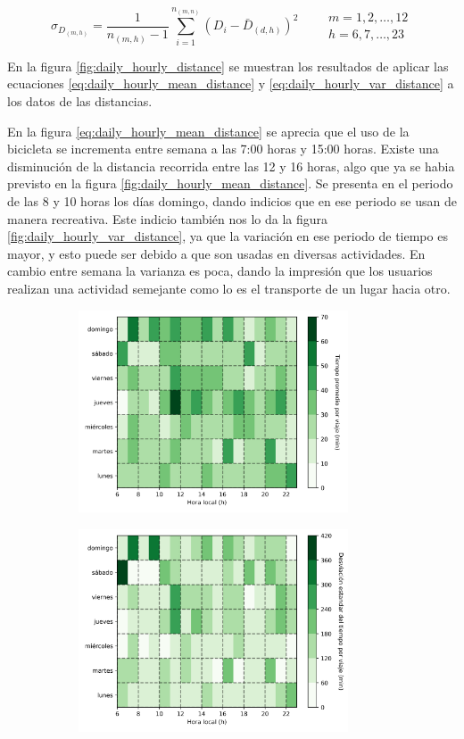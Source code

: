 \begin{equation}
    \sigma_{D_{(m,h)}} = \frac{1}{n_{(m,h)}-1} \sum_{i=1}^{n_{(m,n)}} (D_i-\bar{D}_{(d,h)})^2 \qquad \begin{matrix}
        m=1,2,\dots,12 \\ h=6,7,\dots,23
    \end{matrix} \label{eq:daily_hourly_var_distance}
\end{equation}

En la figura \ref{fig:daily_hourly_distance} se muestran los resultados de aplicar las ecuaciones \ref{eq:daily_hourly_mean_distance} y \ref{eq:daily_hourly_var_distance} a los datos de las distancias.

En la figura \ref{eq:daily_hourly_mean_distance} se aprecia que el uso de la bicicleta se incrementa entre semana a las 7:00 horas y 15:00 horas. Existe una disminución de la distancia recorrida entre las 12 y 16 horas, algo que ya se habia previsto en la figura \ref{fig:daily_hourly_mean_distance}. Se presenta en el periodo de las 8 y 10 horas los días domingo, dando indicios que en ese periodo se usan de manera recreativa. Este indicio también nos lo da la figura \ref{fig:daily_hourly_var_distance}, ya que la variación en ese periodo de tiempo es mayor, y esto puede ser debido a que son usadas en diversas actividades. En cambio entre semana la varianza es poca, dando la impresión que los usuarios realizan una actividad semejante como lo es el transporte de un lugar hacia otro.

\begin{figure}[H]
    \centering
    \begin{subfigure}[b]{8cm}
        \includegraphics[width=8cm]{Graphics/daily_and_hour_mean_time_travel.png}
    \end{subfigure}
    \begin{subfigure}[b]{8cm}
        \includegraphics[width=8cm]{Graphics/daily_and_hour_var_time_travel.png}
    \end{subfigure}
\end{figure}
